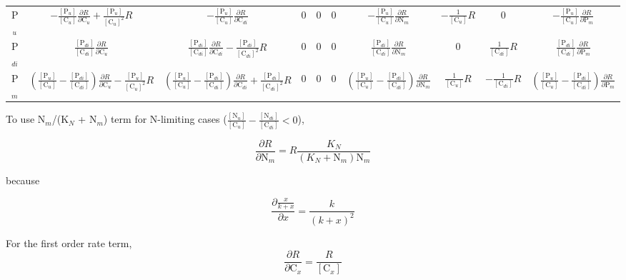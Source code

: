 \documentclass[12pt, a4paper]{article}
\begin{document}
\begin{table}[hb]
{\begin{tabular}{ c | ccccccccc }
  P$_u$      &$-\frac{[\text{P}_u]}{[\text{C}_u]}\frac{\partial R}{\partial \text{C}_u} + \frac{[\text{P}_u]}{[\text{C}_u]^2} R$  & $-\frac{[\text{P}_u]}{[\text{C}_u]}\frac{\partial R}{\partial \text{C}_{di}}$ & 0 &0 &0&$-\frac{[\text{P}_u]}{[\text{C}_u]}\frac{\partial R}{\partial \text{N}_m}$ &$-\frac{1}{[\text{C}_u]} R$ &0&$-\frac{[\text{P}_u]}{[\text{C}_u]}\frac{\partial R}{\partial \text{P}_m}$ \\
  P$_{di}$    &$\frac{[\text{P}_{di}]}{[\text{C}_{di}]} \frac{\partial R}{\partial \text{C}_u}$  & $\frac{[\text{P}_{di}]}{[\text{C}_{di}]} \frac{\partial R}{\partial \text{C}_{di}} - \frac{[\text{P}_{di}]}{[\text{C}_{di}]^2}R$  & 0 & 0 &0&$\frac{[\text{P}_{di}]}{[\text{C}_{di}]} \frac{\partial R}{\partial \text{N}_m}$& 0 & $\frac{1}{[\text{C}_{di}]} R$  & $\frac{[\text{P}_{di}]}{[\text{C}_{di}]} \frac{\partial R}{\partial \text{P}_m}$\\
  P$_m$    &$\left(\frac{[\text{P}_u]}{[\text{C}_u]} - \frac{[\text{P}_{di}]}{[\text{C}_{di}]}\right)\frac{\partial R}{\partial \text{C}_u} - \frac{[\text{P}_u]}{[\text{C}_u]^2} R$  & $\left(\frac{[\text{P}_u]}{[\text{C}_u]} - \frac{[\text{P}_{di}]}{[\text{C}_{di}]}\right)\frac{\partial R}{\partial \text{C}_{di}} + \frac{[\text{P}_{di}]}{[\text{C}_{di}]^2} R$  & 0 &0 &0& $\left(\frac{[\text{P}_u]}{[\text{C}_u]} - \frac{[\text{P}_{di}]}{[\text{C}_{di}]}\right)\frac{\partial R}{\partial \text{N}_m} $ & $\frac{1}{[\text{C}_u]} R$   & $-\frac{1}{[\text{C}_{di}]} R$ & $\left(\frac{[\text{P}_u]}{[\text{C}_u]} - \frac{[\text{P}_{di}]}{[\text{C}_{di}]}\right)\frac{\partial R}{\partial \text{P}_m} $ \\
  \end{tabular}
  }
\end{table}

To use N$_m$/(K$_N$ + N$_m$) term for N-limiting cases ($\frac{[\text{N}_u]}{[\text{C}_u]} - \frac{[\text{N}_{di}]}{[\text{C}_{di}]} < 0$), 

\begin{equation}
\frac{\partial R}{\partial \text{N}_m} = R \frac{K_N}{(K_N + \text{N}_m)\text{N}_m}
\end{equation}

because 

\begin{equation}
\frac{\partial \frac{x}{k+x}}{\partial x} = \frac{k}{(k+x)^2}
\end{equation}

For the first order rate term,
\begin{equation}
\frac{\partial R}{\partial \text{C}_x} = \frac{R}{[\text{C}_x]}
\end{equation}
\end{document}
